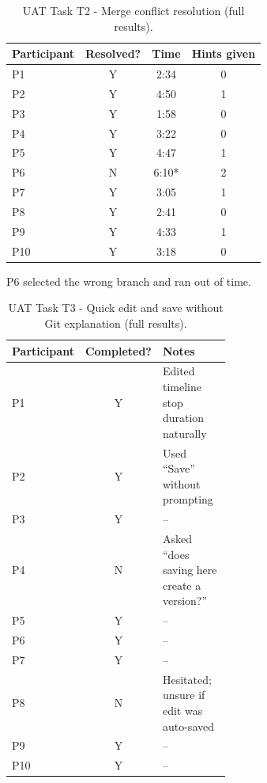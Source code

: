 \begin{table}[H]
\centering
\caption{UAT Task T2 - Merge conflict resolution (full results).}
\begin{tabular}{@{}lccc@{}}
\toprule
\textbf{Participant} & \textbf{Resolved?} & \textbf{Time} &
\textbf{Hints given} \\
\midrule
P1  & Y & 2:34  & 0 \\
P2  & Y & 4:50  & 1 \\
P3  & Y & 1:58  & 0 \\
P4  & Y & 3:22  & 0 \\
P5  & Y & 4:47  & 1 \\
P6  & N & 6:10* & 2 \\
P7  & Y & 3:05  & 1 \\
P8  & Y & 2:41  & 0 \\
P9  & Y & 4:33  & 1 \\
P10 & Y & 3:18  & 0 \\
\bottomrule
\end{tabular}

\vspace{0.3em}
{\footnotesize *P6 selected the wrong branch and ran out of time.}
\end{table}

\begin{table}[H]
\centering
\caption{UAT Task T3 - Quick edit and save without Git explanation (full
results).}
\begin{tabular}{@{}lcp{0.55\linewidth}@{}}
\toprule
\textbf{Participant} & \textbf{Completed?} & \textbf{Notes} \\
\midrule
P1  & Y & Edited timeline stop duration naturally \\
P2  & Y & Used ``Save'' without prompting \\
P3  & Y & -- \\
P4  & N & Asked ``does saving here create a version?'' \\
P5  & Y & -- \\
P6  & Y & -- \\
P7  & Y & -- \\
P8  & N & Hesitated; unsure if edit was auto-saved \\
P9  & Y & -- \\
P10 & Y & -- \\
\bottomrule
\end{tabular}
\end{table}
